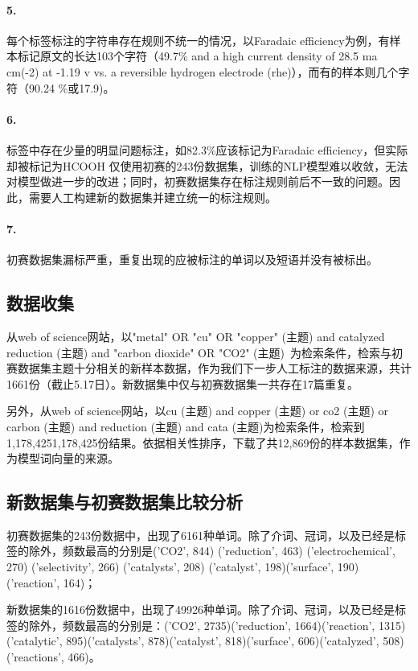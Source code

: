 \documentclass{article}
\begin{document}
\paragraph{5.}每个标签标注的字符串存在规则不统一的情况，以Faradaic efficiency为例，有样本标记原文的长达103个字符（49.7\% and a high current density of 28.5 ma cm(-2) at -1.19 v vs. a reversible hydrogen electrode (rhe)），而有的样本则几个字符（90.24 \%或17.9)。


\paragraph{6.}标签中存在少量的明显问题标注，如82.3\%应该标记为Faradaic efficiency，但实际却被标记为HCOOH
仅使用初赛的243份数据集，训练的NLP模型难以收敛，无法对模型做进一步的改进；同时，初赛数据集存在标注规则前后不一致的问题。因此，需要人工构建新的数据集并建立统一的标注规则。
\paragraph{7.}初赛数据集漏标严重，重复出现的应被标注的单词以及短语并没有被标出。

\subsection{数据收集}
从web of science网站，以"metal" OR "cu" OR "copper" (主题) and catalyzed reduction (主题) and "carbon dioxide" OR "CO2" (主题) 为检索条件，检索与初赛数据集主题十分相关的新样本数据，作为我们下一步人工标注的数据来源，共计1661份（截止5.17日）。新数据集中仅与初赛数据集一共存在17篇重复。


另外，从web of science网站，以cu (主题) and copper (主题) or co2 (主题) or carbon (主题) and reduction (主题) and cata (主题)为检索条件，检索到1,178,4251,178,425份结果。依据相关性排序，下载了共12,869份的样本数据集，作为模型词向量的来源。
\subsection{新数据集与初赛数据集比较分析}
初赛数据集的243份数据中，出现了6161种单词。除了介词、冠词，以及已经是标签的除外，频数最高的分别是('CO2', 844) ('reduction', 463) ('electrochemical', 270) ('selectivity', 266) ('catalysts', 208) ('catalyst', 198)('surface', 190)('reaction', 164)；


新数据集的1616份数据中，出现了49926种单词。除了介词、冠词，以及已经是标签的除外，频数最高的分别是：('CO2', 2735)('reduction', 1664)('reaction', 1315)('catalytic', 895)('catalysts', 878)('catalyst', 818)('surface', 606)('catalyzed', 508)('reactions', 466)。
\end{document}
